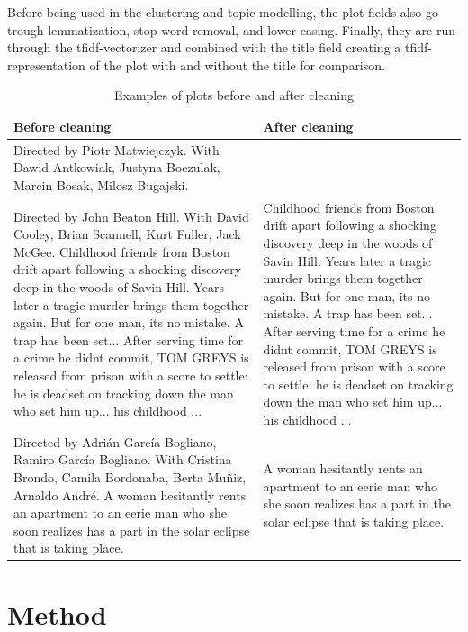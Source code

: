 \documentclass[11pt,a4paper]{article}
\begin{document}
Before being used in the clustering and topic modelling, the plot fields also go trough lemmatization, stop word removal, and lower casing. Finally, they are run through the tfidf-vectorizer and combined with the title field creating a tfidf-representation of the plot with and without the title for comparison.

\begin{table}[ht]
\centering
\label{fig:plot_examples}
\begin{tabular}{p{8cm}p{8cm}}
  \hline
 \textbf{Before cleaning} & \textbf{After cleaning} \\ 
  \hline
 Directed by Piotr Matwiejczyk. With Dawid Antkowiak, Justyna Boczulak, Marcin Bosak, Milosz Bugajski. &  \\ 
 \hline
 Directed by John Beaton Hill. With David Cooley, Brian Scannell, Kurt Fuller, Jack McGee. Childhood friends from Boston drift apart following a shocking discovery deep in the woods of Savin Hill. Years later a tragic murder brings them together again. But for one man, its no mistake. A trap has been set... After serving time for a crime he didnt commit, TOM GREYS is released from prison with a score to settle: he is deadset on tracking down the man who set him up... his childhood ... & Childhood friends from Boston drift apart following a shocking discovery deep in the woods of Savin Hill. Years later a tragic murder brings them together again. But for one man, its no mistake. A trap has been set... After serving time for a crime he didnt commit, TOM GREYS is released from prison with a score to settle: he is deadset on tracking down the man who set him up... his childhood ... \\ 
 \hline
 Directed by Adrián García Bogliano, Ramiro García Bogliano. With Cristina Brondo, Camila Bordonaba, Berta Muñiz, Arnaldo André. A woman hesitantly rents an apartment to an eerie man who she soon realizes has a part in the solar eclipse that is taking place. & A woman hesitantly rents an apartment to an eerie man who she soon realizes has a part in the solar eclipse that is taking place. \\ 
   \hline
\end{tabular}
\caption{Examples of plots before and after cleaning}
\end{table}

\clearpage

\section{Method}
\end{document}
